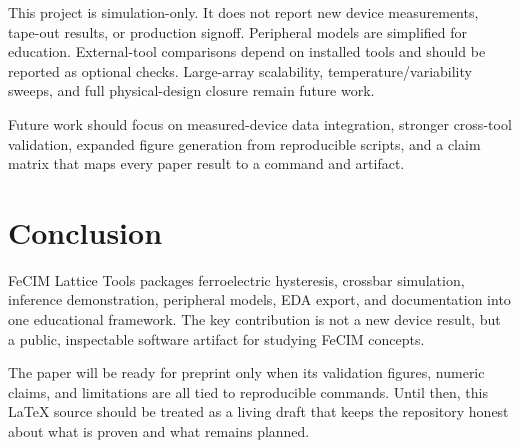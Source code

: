 \documentclass[11pt]{article}
\newcommand{\project}{FeCIM Lattice Tools}
\begin{document}
This project is simulation-only. It does not report new device measurements, tape-out results, or production signoff. Peripheral models are simplified for education. External-tool comparisons depend on installed tools and should be reported as optional checks. Large-array scalability, temperature/variability sweeps, and full physical-design closure remain future work.

Future work should focus on measured-device data integration, stronger cross-tool validation, expanded figure generation from reproducible scripts, and a claim matrix that maps every paper result to a command and artifact.

\section{Conclusion}

\project{} packages ferroelectric hysteresis, crossbar simulation, inference demonstration, peripheral models, EDA export, and documentation into one educational framework. The key contribution is not a new device result, but a public, inspectable software artifact for studying FeCIM concepts.

The paper will be ready for preprint only when its validation figures, numeric claims, and limitations are all tied to reproducible commands. Until then, this LaTeX source should be treated as a living draft that keeps the repository honest about what is proven and what remains planned.



\end{document}
